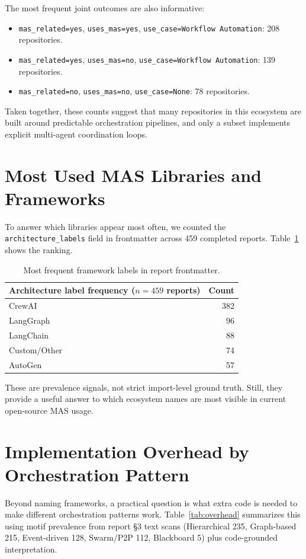 \documentclass[12pt,a4paper,onecolumn]{article}
\begin{document}
The most frequent joint outcomes are also informative:
\begin{itemize}
  \item \texttt{mas\_related=yes}, \texttt{uses\_mas=yes}, \texttt{use\_case=Workflow Automation}: 208 repositories.
  \item \texttt{mas\_related=yes}, \texttt{uses\_mas=no}, \texttt{use\_case=Workflow Automation}: 139 repositories.
  \item \texttt{mas\_related=no}, \texttt{uses\_mas=no}, \texttt{use\_case=None}: 78 repositories.
\end{itemize}

Taken together, these counts suggest that many repositories in this ecosystem are built around predictable orchestration pipelines, and only a subset implements explicit multi-agent coordination loops.

\section{Most Used MAS Libraries and Frameworks}
To answer which libraries appear most often, we counted the \texttt{architecture\_labels} field in frontmatter across 459 completed reports. Table~\ref{tab:frameworks} shows the ranking.

\begin{table}[ht]
\centering
\begin{tabular}{lr}
\toprule
Architecture label frequency (\(n=459\) reports) & Count \\
\midrule
CrewAI & 382 \\
LangGraph & 96 \\
LangChain & 88 \\
Custom/Other & 74 \\
AutoGen & 57 \\
\bottomrule
\end{tabular}
\caption{Most frequent framework labels in report frontmatter.}
\label{tab:frameworks}
\end{table}

These are prevalence signals, not strict import-level ground truth. Still, they provide a useful answer to which ecosystem names are most visible in current open-source MAS usage.

\section{Implementation Overhead by Orchestration Pattern}
Beyond naming frameworks, a practical question is what extra code is needed to make different orchestration patterns work. Table~\ref{tab:overhead} summarizes this using motif prevalence from report \S3 text scans (Hierarchical 235, Graph-based 215, Event-driven 128, Swarm/P2P 112, Blackboard 5) plus code-grounded interpretation.
\end{document}

